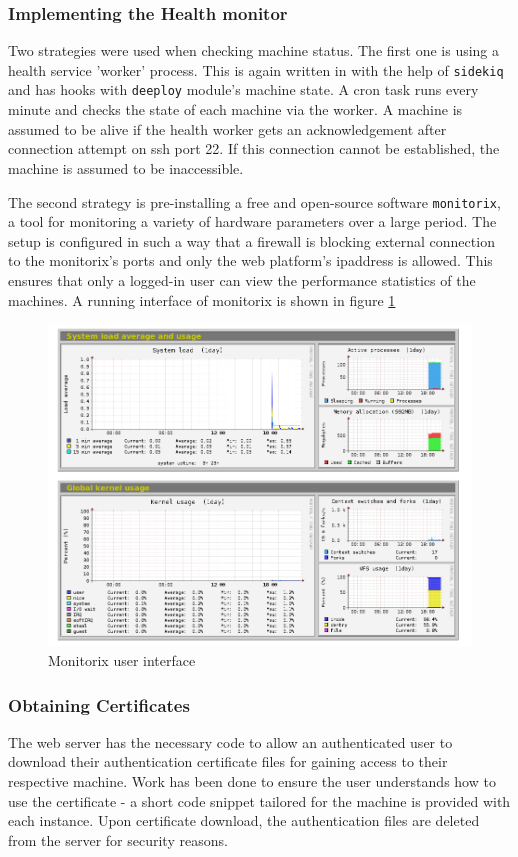 \documentclass{article}
\begin{document}
\subsubsection{Implementing the Health monitor}
Two strategies were used when checking machine status. The first one is using a health service 'worker' process. This is again written in with the help of \texttt{sidekiq} and has hooks with \texttt{deeploy} module's machine state. A \gls{cron} task runs every minute and checks the state of each machine via the worker. A machine is assumed to be alive if the health worker gets an acknowledgement after connection attempt on \gls{ssh} port 22. If this connection cannot be established, the machine is assumed to be inaccessible.

The second strategy is pre-installing a free and open-source software \texttt{monitorix}, a tool for monitoring a variety of hardware parameters over a large period. The setup is configured in such a way that a firewall is blocking external connection to the monitorix's ports and only the web platform's \gls{ipaddress} is allowed. This ensures that only a logged-in user can view the performance statistics of the machines. A running interface of monitorix is shown in figure \ref{fig:monitorix-example}

\begin{figure}[h!]
	\vspace{0.5cm}
	\includegraphics[width=12cm]{monitorix_screenshot_orig.png}
	\vspace{0.5cm}
	\caption{Monitorix user interface}
	\label{fig:monitorix-example}
\end{figure}


\subsubsection{Obtaining Certificates}
The web server has the necessary code to allow an authenticated user to download their authentication certificate files for gaining access to their respective machine. Work has been done to ensure the user understands how to use the certificate - a short code snippet tailored for the machine is provided with each instance. Upon certificate download, the authentication files are deleted from the server for security reasons.
\end{document}
